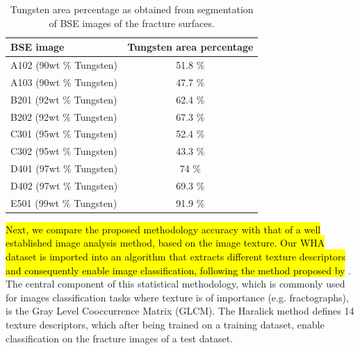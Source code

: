 \documentclass[authoryear,preprint,review,12pt, singleside]{elsarticle}
\begin{document}


\begin{table}[h!]
	\centering
	\begin{tabular}[t]{ l  c } 
		\toprule
		BSE image \hspace{1ex}   \hspace{2ex}  &  Tungsten area percentage \\ \toprule
		A102  (90wt \% Tungsten) \hspace{1ex}  &  51.8 \% \\
		A103  (90wt \% Tungsten) \hspace{1ex}  & 47.7 \% \\
		B201  (92wt \% Tungsten) \hspace{1ex}  &  62.4 \% \\
		B202  (92wt \% Tungsten) \hspace{1ex}  & 67.3 \% \\
		C301  (95wt \% Tungsten) \hspace{1ex}  &  52.4 \% \\
		C302  (95wt \% Tungsten) \hspace{1ex}  & 43.3 \% \\
		D401  (97wt \% Tungsten) \hspace{1ex}  &  74 \% \\
		D402  (97wt \% Tungsten) \hspace{1ex}  & 69.3 \% \\
		E501  (99wt \% Tungsten) \hspace{1ex}  &  91.9 \% \\
		\bottomrule
	\end{tabular}
	\caption{Tungsten area percentage as obtained from segmentation of BSE images of the fracture surfaces.}
	\label{table:T2} 
\end{table} 

\hl{Next, we compare the proposed methodology accuracy with that of a well established image analysis method, based on the image texture. Our WHA dataset is imported into an algorithm that extracts different texture descriptors and consequently enable image classification, following the method proposed by} \citet{haralick}. The central component of this statistical methodology, which is commonly used for images classification tasks where texture is of importance (e.g. fractographs), is the Gray Level Cooccurrence Matrix (GLCM). The Haralick method defines 14 texture descriptors, which after being trained on a training dataset, enable classification on the fracture images of a test dataset. 
\end{document}
